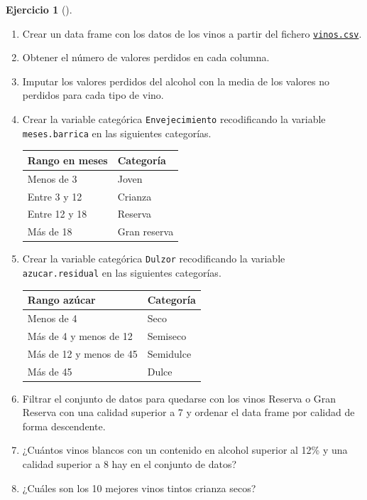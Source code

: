 \documentclass[
  a4paper,
]{scrreport}
\theoremstyle{definition}
\newtheorem{exercise}{Ejercicio}[chapter]
\theoremstyle{remark}
\begin{document}
\begin{exercise}[]
\begin{enumerate}
\def\labelenumi{\alph{enumi}.}
\item
  Crear un data frame con los datos de los vinos a partir del fichero
  \href{datos/vinos.csv}{\texttt{vinos.csv}}.
\item
  Obtener el número de valores perdidos en cada columna.
\item
  Imputar los valores perdidos del alcohol con la media de los valores
  no perdidos para cada tipo de vino.
\item
  Crear la variable categórica \texttt{Envejecimiento} recodificando la
  variable \texttt{meses.barrica} en las siguientes categorías.

  \begin{longtable}[]{@{}ll@{}}
  \toprule\noalign{}
  Rango en meses & Categoría \\
  \midrule\noalign{}
  \endhead
  \bottomrule\noalign{}
  \endlastfoot
  Menos de 3 & Joven \\
  Entre 3 y 12 & Crianza \\
  Entre 12 y 18 & Reserva \\
  Más de 18 & Gran reserva \\
  \end{longtable}
\item
  Crear la variable categórica \texttt{Dulzor} recodificando la variable
  \texttt{azucar.residual} en las siguientes categorías.

  \begin{longtable}[]{@{}ll@{}}
  \toprule\noalign{}
  Rango azúcar & Categoría \\
  \midrule\noalign{}
  \endhead
  \bottomrule\noalign{}
  \endlastfoot
  Menos de 4 & Seco \\
  Más de 4 y menos de 12 & Semiseco \\
  Más de 12 y menos de 45 & Semidulce \\
  Más de 45 & Dulce \\
  \end{longtable}
\item
  Filtrar el conjunto de datos para quedarse con los vinos Reserva o
  Gran Reserva con una calidad superior a 7 y ordenar el data frame por
  calidad de forma descendente.
\item
  ¿Cuántos vinos blancos con un contenido en alcohol superior al 12\% y
  una calidad superior a 8 hay en el conjunto de datos?
\item
  ¿Cuáles son los 10 mejores vinos tintos crianza secos?
\end{enumerate}

\end{exercise}
\end{document}
